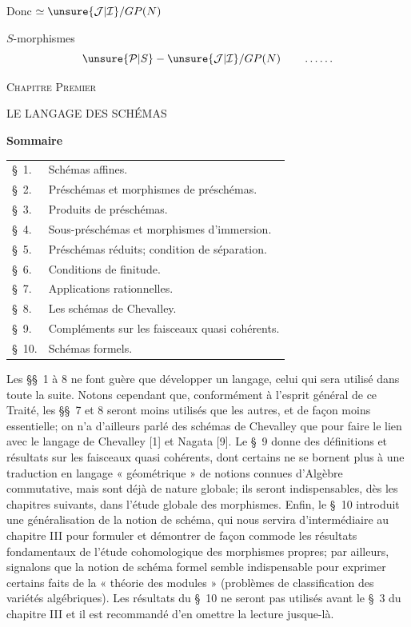 Donc $\simeq\unsure{\mathcal J|\mathcal I}/GP(N)$ 

 $S$-morphismes
\[
\unsure{\mathcal P|S}-\unsure{\mathcal J|\mathcal I}/GP(N)\qquad\ldots\ldots
\]


\begin{center}
\textsc{Chapitre Premier}

LE LANGAGE DES SCHÉMAS

\textbf{Sommaire}
\end{center}

\begin{tabular}{ll}
\S\ 1. & Schémas affines.\\
\S\ 2. & Préschémas et morphismes de préschémas.\\
\S\ 3. & Produits de préschémas.\\
\S\ 4. & Sous-préschémas et morphismes d'immersion.\\
\S\ 5. & Préschémas réduits; condition de séparation.\\
\S\ 6. & Conditions de finitude.\\
\S\ 7. & Applications rationnelles.\\
\S\ 8. & Les schémas de Chevalley.\\
\S\ 9. & Compléments sur les faisceaux quasi cohérents.\\
\S\ 10. & Schémas formels.
\end{tabular}

Les \S\S\ 1 à 8 ne font guère que développer un langage, celui qui sera utilisé dans toute la suite. Notons cependant que, conformément à l'esprit général de ce Traité, les \S\S\ 7 et 8 seront moins utilisés que les autres, et de façon moins essentielle; on n'a d'ailleurs parlé des schémas de Chevalley que pour faire le lien avec le langage de Chevalley [1] et Nagata [9]. Le \S\ 9 donne des définitions et résultats sur les faisceaux quasi cohérents, dont certains ne se bornent plus à une traduction en langage « géométrique » de notions connues d'Algèbre commutative, mais sont déjà de nature globale; ils seront indispensables, dès les chapitres suivants, dans l'étude globale des morphismes. Enfin, le \S\ 10 introduit une généralisation de la notion de schéma, qui nous servira d'intermédiaire au chapitre III pour formuler et démontrer de façon commode les résultats fondamentaux de l'étude cohomologique des morphismes propres; par ailleurs, signalons que la notion de schéma formel semble indispensable pour exprimer certains faits de la « théorie des modules » (problèmes de classification des variétés algébriques). Les résultats du \S\ 10 ne seront pas utilisés avant le \S\ 3 du chapitre III et il est recommandé d'en omettre la lecture jusque-là.

